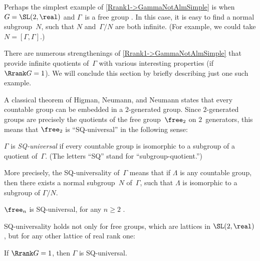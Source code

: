 
\begin{rem}
Perhaps the simplest example of \cref{Rrank1->GammaNotAlmSimple} is when $G = \SL(2,\real)$ and $\Gamma$~is a free group . In this case, it is easy to find a normal subgroup~$N$, such that $N$ and~$\Gamma/N$ are both infinite. (For example, we could take $N = [\Gamma,\Gamma]$.)
\end{rem}

There are numerous strengthenings of \cref{Rrank1->GammaNotAlmSimple} that provide infinite quotients of~$\Gamma$ with various interesting properties (if $\Rrank G = 1$). 
We will conclude this section by briefly describing just one such example.

A classical theorem of 
	\label{HNNThm}%
	Higman, Neumann, and Neumann states that every countable group can be embedded in a $2$-generated group. Since $2$-generated groups are precisely the quotients of the free group~$\free_2$ on $2$~generators, this means that $\free_2$ is ``SQ-universal'' in the following sense:

\begin{defn}
$\Gamma$ is \emph{SQ-universal} if every countable group is isomorphic to a subgroup of a quotient of~$\Gamma$. 
 (The letters ``SQ'' stand for ``subgroup-quotient\zz.'')

More precisely, the SQ-universality of~$\Gamma$ means that if $\Lambda$ is any countable group, then there exists a normal subgroup~$N$ of~$\Gamma$, such that $\Lambda$ is isomorphic to a subgroup of $\Gamma/N$.
\end{defn}

\begin{eg} \label{FnSQUnivEg}
$\free_n$ is SQ-universal, for any $n \ge 2$ .
\end{eg}

SQ-universality holds not only for free groups, which are lattices in $\SL(2,\real)$ , but for any other lattice of real rank one:

\begin{thm} \label{Rank1SQUniv}
If\/ $\Rrank G = 1$, then\/ $\Gamma$ is SQ-universal.
\end{thm}

